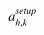 

    \[\let\par\empty

    
{{{{\miitalic{a}}}\sb{{{\miitalic{h}}{\miitalic{,}}{\miitalic{k}}}}\sp{{\miitalic{setup}}}}}


    \]

  